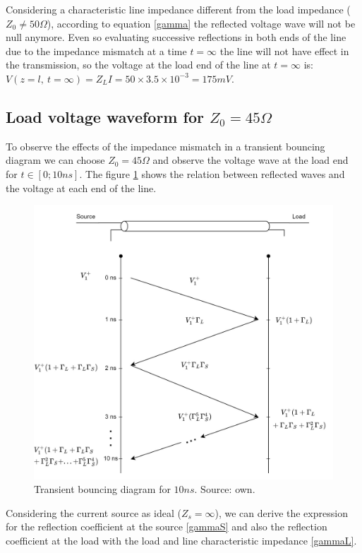 Considering a characteristic line impedance different from the load impedance ($Z_0 \neq 50 \Omega$), according to equation \ref{gamma} the reflected voltage wave will not be null anymore. Even so evaluating successive reflections in both ends of the line due to the impedance mismatch  at a time $t=\infty$ the line will not have effect in the transmission, so the voltage at the load end of the line at $t=\infty$ is: $V(z=l, \: t=\infty) = Z_L I = 50 \times 3.5 \times 10^{-3} = 175mV$.

\subsection{Load voltage waveform for $Z_0=45 \Omega$}

To observe the effects of the impedance mismatch in a transient bouncing diagram we can choose $Z_0=45 \Omega$ and observe the voltage wave at the load end for $t \in [0;10ns]$. The figure \ref{bouncing} shows the relation between reflected waves and the voltage at each end of the line.

\begin{figure}[H] 
\centering
\includegraphics[width=12cm]{images/transient_bouncing_diagram.jpg}
\caption{Transient bouncing diagram for $10ns$. Source: own.}
\label{bouncing} 
\end{figure}

Considering the current source as ideal ($Z_s=\infty$), we can derive the expression for the reflection coefficient at the source \ref{gammaS} and also the reflection coefficient at the load with the load and line characteristic impedance \ref{gammaL}.

